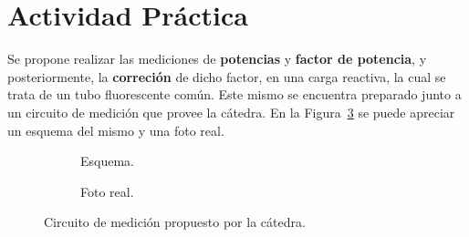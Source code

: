   \pagebreak
  \section{Actividad Práctica}
    Se propone realizar las mediciones de \textbf{potencias} y \textbf{factor de potencia}, y posteriormente,
    la \textbf{correción} de dicho factor, en una carga reactiva, la cual se trata de un tubo fluorescente 
    común. Este mismo se encuentra preparado junto a un circuito de medición que provee la cátedra. En la 
    Figura~\ref{fig:CircuitoMedicion} se puede apreciar un esquema del mismo y una foto real.

    \begin{figure}[H]
      \centering
        \begin{subfigure}[t]{0.7\textwidth}
          \centering
          \caption{Esquema.}
          \label{fig:EsquemaCircuito}
        \end{subfigure}
        \begin{subfigure}[t]{0.7\textwidth}
          \centering
          \caption{Foto real.}
          \label{fig:FotoRealCircuito}
        \end{subfigure}
      \caption{Circuito de medición propuesto por la cátedra.}
      \label{fig:CircuitoMedicion}
    \end{figure}

